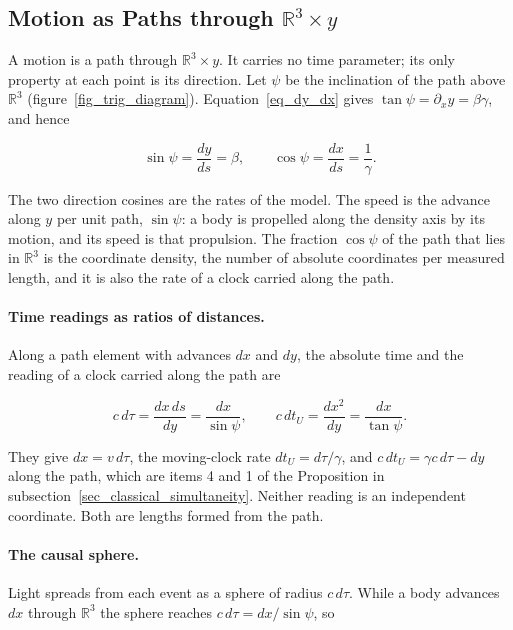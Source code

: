 \documentclass{iopjournal}
\begin{document}
\subsection{Motion as Paths through \texorpdfstring{$\mathbb{R}^3\times y$}{R3 x y}}\label{sec_paths}

A motion is a path through $\mathbb{R}^3\times y$. It carries no time parameter; its only property at each point is its direction. Let $\psi$ be the inclination of the path above $\mathbb{R}^3$ (figure~\ref{fig_trig_diagram}). Equation~\eqref{eq_dy_dx} gives $\tan\psi=\partial_x y=\beta\gamma$, and hence

\begin{equation}\label{eq_path_angle}
    \sin\psi=\frac{dy}{ds}=\beta,
    \qquad
    \cos\psi=\frac{dx}{ds}=\frac{1}{\gamma}.
\end{equation}

The two direction cosines are the rates of the model. The speed is the advance along $y$ per unit path, $\sin\psi$: a body is propelled along the density axis by its motion, and its speed is that propulsion. The fraction $\cos\psi$ of the path that lies in $\mathbb{R}^3$ is the coordinate density, the number of absolute coordinates per measured length, and it is also the rate of a clock carried along the path.

\paragraph{Time readings as ratios of distances.} Along a path element with advances $dx$ and $dy$, the absolute time and the reading of a clock carried along the path are

\begin{equation}\label{eq_path_times}
    c\,d\tau=\frac{dx\,ds}{dy}=\frac{dx}{\sin\psi},
    \qquad
    c\,dt_U=\frac{dx^2}{dy}=\frac{dx}{\tan\psi}.
\end{equation}

They give $dx=v\,d\tau$, the moving-clock rate $dt_U=d\tau/\gamma$, and $c\,dt_U=\gamma c\,d\tau-dy$ along the path, which are items 4 and 1 of the Proposition in subsection~\ref{sec_classical_simultaneity}. Neither reading is an independent coordinate. Both are lengths formed from the path.

\paragraph{The causal sphere.} Light spreads from each event as a sphere of radius $c\,d\tau$. While a body advances $dx$ through $\mathbb{R}^3$ the sphere reaches $c\,d\tau=dx/\sin\psi$, so
\end{document}
